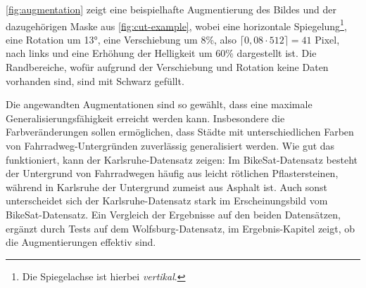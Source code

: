 \autoref{fig:augmentation} zeigt eine beispielhafte Augmentierung des Bildes und der dazugehörigen Maske aus \autoref{fig:cut-example},
wobei eine horizontale Spiegelung\footnote{Die Spiegelachse ist hierbei \textit{vertikal}.},
eine Rotation um 13°, eine Verschiebung um 8\%, also $\lceil 0,08 \cdot 512 \rceil = 41$ Pixel,
nach links und eine Erhöhung der Helligkeit um 60\% dargestellt ist. 
Die Randbereiche, wofür aufgrund der Verschiebung und Rotation keine Daten vorhanden sind, sind mit Schwarz gefüllt. 

Die angewandten Augmentationen sind so gewählt, dass eine maximale Generalisierungsfähigkeit erreicht werden kann. 
Insbesondere die Farbveränderungen sollen ermöglichen, dass Städte mit unterschiedlichen Farben von Fahrradweg-Untergründen 
zuverlässig generalisiert werden. Wie gut das funktioniert, kann der Karlsruhe-Datensatz zeigen: Im BikeSat-Datensatz 
besteht der Untergrund von Fahrradwegen häufig aus leicht rötlichen Pflastersteinen, während in Karlsruhe der Untergrund zumeist 
aus Asphalt ist.   
Auch sonst unterscheidet sich der Karlsruhe-Datensatz stark im Erscheinungsbild vom BikeSat-Datensatz. 
Ein Vergleich der Ergebnisse auf den beiden Datensätzen, 
ergänzt durch Tests auf dem Wolfsburg-Datensatz, im Ergebnis-Kapitel zeigt, ob die Augmentierungen effektiv sind. 

